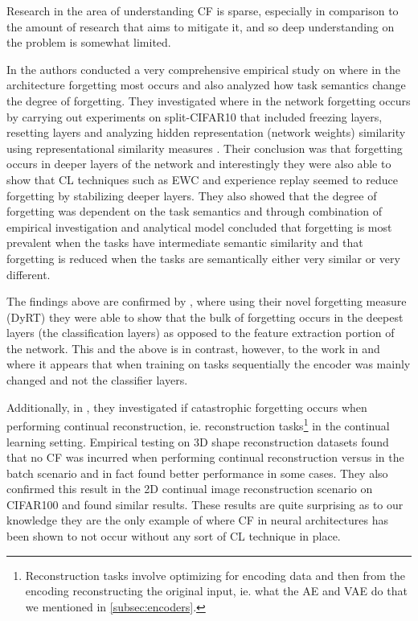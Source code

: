 Research in the area of understanding CF is sparse, especially in comparison to the amount of research that aims to mitigate it, and so deep understanding on the problem is somewhat limited. 

In \cite{ramasesh2020anatomy} the authors conducted a very comprehensive empirical study on where in the architecture forgetting most occurs and also analyzed how task semantics change the degree of forgetting. They investigated where in the network forgetting occurs by carrying out experiments on split-CIFAR10 that included freezing layers, resetting layers and analyzing hidden representation (network weights) similarity using representational similarity measures \cite{raghu2017svcca,kornblith2019similarity}. Their conclusion was that forgetting occurs in deeper layers of the network and interestingly they were also able to show that CL techniques such as EWC \cite{kirkpatrick2017reg} and experience replay \cite{rolnick2019replay} seemed to reduce forgetting by stabilizing deeper layers. They also showed that the degree of forgetting was dependent on the task semantics and through combination of empirical investigation and analytical model concluded that forgetting is most prevalent when the tasks have intermediate semantic similarity and that forgetting is reduced when the tasks are semantically either very similar or very different.

The findings above are confirmed by \cite{thai2021does}, where using their novel forgetting measure (DyRT) they were able to show that the bulk of forgetting occurs in the deepest layers (the classification layers) as opposed to the feature extraction portion of the network. This and the above is in contrast, however, to the work in \cite{rebuffi2017icarl} and \cite{li2017learning} where it appears that when training on tasks sequentially the encoder was mainly changed and not the classifier layers. 

Additionally, in \cite{thai2021does}, they investigated if catastrophic forgetting occurs when performing continual reconstruction, ie. reconstruction tasks\footnote{Reconstruction tasks involve optimizing for encoding data and then from the encoding reconstructing the original input, ie. what the AE and VAE do that we mentioned in \ref{subsec:encoders}.} in the continual learning setting. Empirical testing on 3D shape reconstruction datasets found that no CF was incurred when performing continual reconstruction versus in the batch scenario and in fact found better performance in some cases. They also confirmed this result in the 2D continual image reconstruction scenario on CIFAR100 and found similar results. These results are quite surprising as to our knowledge they are the only example of where CF in neural architectures has been shown to not occur without any sort of CL technique in place.

